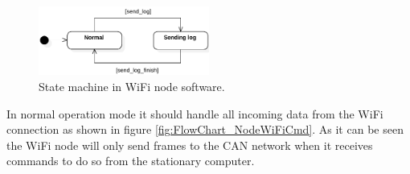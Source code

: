\begin{figure}[!h]
\centering
\includegraphics[width=0.5\textwidth]{graphics/StateDiagram_NodeWiFiStates}
\caption{State machine in WiFi node software.}
\label{fig:StateDiagram_NodeWiFiStates}
\end{figure}

In normal operation mode it should handle all incoming data from the WiFi connection as shown in figure \ref{fig:FlowChart_NodeWiFiCmd}.
As it can be seen the WiFi node will only send frames to the CAN network when it receives commands to do so from the stationary computer.\\

